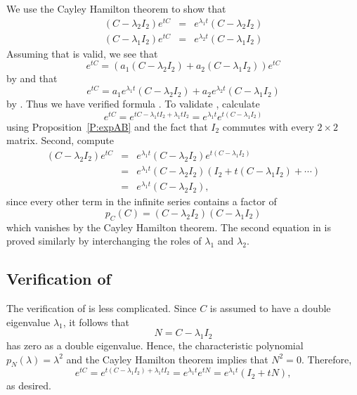 We use the Cayley Hamilton theorem to show that
\begin{equation}  \label{E:almost}
\begin{array}{rcl}
(C - \lambda_2I_2)e^{tC} & = & e^{\lambda_1 t}(C - \lambda_2I_2)\\
(C - \lambda_1I_2)e^{tC} & = & e^{\lambda_2 t}(C - \lambda_1I_2)
\end{array}
\end{equation}
Assuming that  is valid, we see that
\[
e^{tC} = (a_1 (C - \lambda_2I_2) + a_2 (C - \lambda_1I_2))e^{tC}
\]
by  and that
\[
e^{tC} = a_1 e^{\lambda_1 t}(C - \lambda_2I_2) +
a_2 e^{\lambda_2 t}(C - \lambda_1I_2)
\]
by .  Thus we have verified formula .
To validate , calculate
\[
e^{tC} = e^{tC - \lambda_1 tI_2 + \lambda_1 tI_2} =
e^{\lambda_1t}e^{t(C - \lambda_1 I_2)}
\]
using Proposition~\ref{P:expAB} and the fact that $I_2$ commutes with every
$2\times 2$ matrix.  Second, compute
\begin{eqnarray*}
(C - \lambda_2I_2)e^{tC} & = &
e^{\lambda_1 t}(C - \lambda_2I_2)e^{t(C - \lambda_1 I_2)} \\
& = &  e^{\lambda_1 t}(C - \lambda_2I_2)(I_2 + t(C - \lambda_1 I_2) + \cdots)\\
& = & e^{\lambda_1 t}(C - \lambda_2I_2),
\end{eqnarray*}
since every other term in the infinite series contains a factor of
\[
p_C(C) = (C - \lambda_2I_2)(C - \lambda_1 I_2)
\]
which vanishes by the Cayley Hamilton theorem.  The second equation in
 is proved similarly by interchanging the roles of $\lambda_1$
and $\lambda_2$.

\subsection*{Verification of \protect{}}

The verification of  is less complicated.  Since $C$ is assumed
to have a double eigenvalue $\lambda_1$, it follows that
\[
N = C - \lambda_1 I_2
\]
has zero as a double eigenvalue.  Hence, the characteristic polynomial
$p_N(\lambda) = \lambda^2$ and the Cayley Hamilton theorem implies that
$N^2=0$.  Therefore,
\[
e^{tC} = e^{t(C-\lambda_1 I_2)+\lambda_1 tI_2} =
e^{\lambda_1 t}e^{tN} = e^{\lambda_1 t}(I_2+tN),
\]
as desired.




\EXER

\TEXER

